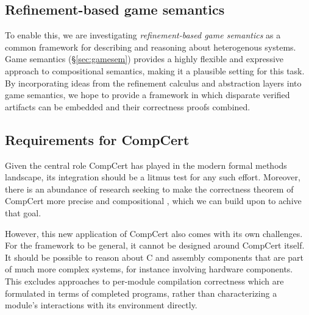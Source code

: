 \documentclass[sigplan,10pt,review,anonymous]{acmart}\settopmatter{printfolios=true,printccs=false,printacmref=false}
\begin{document}

\subsection{Refinement-based game semantics} %

To enable this,
we are investigating
\emph{refinement-based game semantics}
as a common framework for
describing and reasoning about heterogenous systems.
Game semantics (\S\ref{sec:gamesem})
provides a highly flexible and expressive approach
to compositional semantics,
making it a plausible setting for this task.
By incorporating ideas from
the refinement calculus \cite{refcal}
and abstraction layers \cite{popl15}
into game semantics,
we hope to provide a framework
in which disparate verified artifacts
can be embedded and their correctness proofs combined.


\subsection{Requirements for CompCert} \label{sec:compcertreq} %

Given the central role CompCert has played
in the modern formal methods landscape,
its integration
should be a litmus test for any such effort.
Moreover, there is an abundance of research
seeking to make the correctness theorem of CompCert
more precise and compositional
\cite{qompcert,sepcompcert,compcompcert,compcerttso,compcertshm,compcertm},
which we can build upon to achive that goal.

However, this new application of CompCert also
comes with its own challenges.
For the framework to be general,
it cannot be designed around CompCert itself.
It should be possible to reason about
C and assembly components that are part of
much more complex systems,
for instance
involving hardware components.
This excludes approaches to
per-module compilation correctness which are formulated in terms
of completed programs,
rather than characterizing a module's interactions
with its environment directly.
\end{document}
